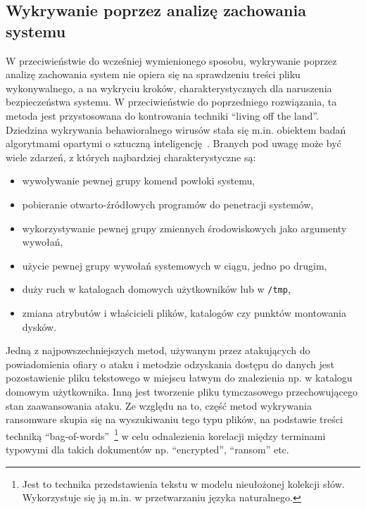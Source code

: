 \subsection{Wykrywanie poprzez analizę zachowania systemu}
\label{sec:behav}
W przeciwieństwie do wcześniej wymienionego sposobu, wykrywanie poprzez analizę zachowania system nie opiera się na sprawdzeniu treści pliku wykonywalnego, 
a na wykryciu kroków, charakterystycznych dla naruszenia bezpieczeństwa systemu. 
W przeciwieństwie do poprzedniego rozwiązania, ta metoda jest przystosowana do kontrowania techniki \foreignquote{english}{living off the land}.
Dziedzina wykrywania behawioralnego wirusów stała się m.in. obiektem badań algorytmami opartymi o sztuczną inteligencję~\cite{vehabovic_ransomware_2022}. Branych pod uwagę
może być wiele zdarzeń, z których najbardziej charakterystyczne są:
\begin{itemize}
    \item wywoływanie pewnej grupy komend powłoki systemu,
    \item pobieranie otwarto-źródłowych programów do penetracji systemów,
    \item wykorzystywanie pewnej grupy zmiennych środowiskowych jako argumenty wywołań,
    \item użycie pewnej grupy wywołań systemowych w ciągu, jedno po drugim,
    \item duży ruch w katalogach domowych użytkowników lub w \texttt{/tmp},
    \item zmiana atrybutów i właścicieli plików, katalogów czy punktów montowania dysków.
\end{itemize}
Jedną z najpowszechniejszych metod, używanym przez atakujących do powiadomienia ofiary o ataku i metodzie odzyskania dostępu do danych 
jest pozostawienie pliku tekstowego w miejscu łatwym do znalezienia np. w 
katalogu domowym użytkownika. Inną jest tworzenie pliku tymczasowego przechowującego 
stan zaawansowania ataku. Ze względu na to, część metod wykrywania ransomware skupia się
na wyszukiwaniu tego typu plików, na podstawie treści techniką 
\foreignquote{english}{bag-of-words}~\footnote{Jest to technika przedstawienia 
tekstu w modelu nieułożonej kolekcji słów. Wykorzystuje się ją m.in. w przetwarzaniu 
języka naturalnego.} w celu odnalezienia korelacji między terminami typowymi dla 
takich dokumentów np. \foreignquote{english}{encrypted}, \foreignquote{english}{ransom}
etc.
